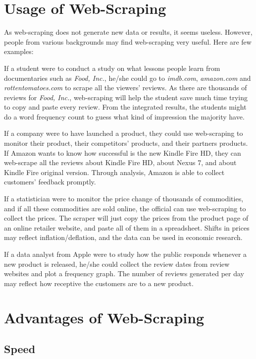 \documentclass[12pt]{report}
\begin{document}
\section{Usage of Web-Scraping}
As web-scraping does not generate new data or results, it seems useless. However, people from various backgrounds may find web-scraping very useful. Here are few examples:

If a student were to conduct a study on what lessons people learn from documentaries such as \textit{Food, Inc.}, he/she could go to \textit{imdb.com}, \textit{amazon.com} and \textit{rottentomatoes.com} to scrape all the viewers' reviews. As there are thousands of reviews for \textit{Food, Inc.}, web-scraping will help the student save much time trying to copy and paste every review. From the integrated results, the students might do a word frequency count to guess what kind of impression the majority have.

If a company were to have launched a product, they could use web-scraping to monitor their product, their competitors' products, and their partners products. If Amazon wants to know how successful is the new Kindle Fire HD, they can web-scrape all the reviews about Kindle Fire HD, about Nexus 7, and about Kindle Fire original version. Through analysis, Amazon is able to collect customers' feedback promptly.

If a statistician were to monitor the price change of thousands of commodities, and if all these commodities are sold online, the official can use web-scraping to collect the prices. The scraper will just copy the prices from the product page of an online retailer website, and paste all of them in a spreadsheet. Shifts in prices may reflect inflation/deflation, and the data can be used in economic research.

If a data analyst from Apple were to study how the public responds whenever a new product is released, he/she could collect the review dates from review websites and plot a frequency graph. The number of reviews generated per day may reflect how receptive the customers are to a new product.

\section{Advantages of Web-Scraping}

\subsection{Speed}
\end{document}
